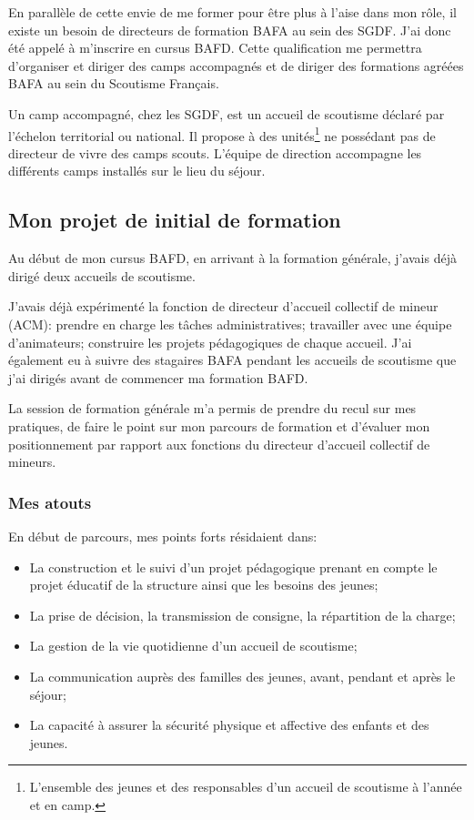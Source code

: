 \documentclass[titlepage,11pt,a4paper]{article}
\begin{document}
En parallèle de cette envie de me former pour être plus à l'aise dans mon rôle,
il existe un besoin de directeurs de formation BAFA au sein des SGDF. J'ai donc été appelé
à m'inscrire en cursus BAFD. Cette qualification me permettra d'organiser et diriger des
camps accompagnés et de diriger des formations agréées BAFA au sein du Scoutisme Français.

Un camp accompagné, chez les SGDF, est un accueil de scoutisme déclaré par l'échelon
territorial ou national. Il propose à des unités\footnote{L'ensemble des jeunes et des
responsables d'un accueil de scoutisme à l'année et en camp.} ne possédant pas
de directeur de vivre des camps scouts. L'équipe de direction accompagne les différents
camps installés sur le lieu du séjour.

\subsection{Mon projet de initial de formation}

Au début de mon cursus BAFD, en arrivant à la formation générale, j'avais déjà dirigé deux
accueils de scoutisme.

J'avais déjà expérimenté la fonction de directeur d'accueil collectif de mineur (ACM):
prendre en charge les tâches administratives; travailler avec une équipe d'animateurs;
construire les projets pédagogiques de chaque accueil. J'ai également eu à suivre des
stagaires BAFA pendant les accueils de scoutisme que j'ai dirigés avant de commencer ma
formation BAFD.

La session de formation générale m'a permis de prendre du recul sur mes pratiques, de
faire le point sur mon parcours de formation et d'évaluer mon positionnement par rapport
aux fonctions du directeur d'accueil collectif de mineurs.

\subsubsection{Mes atouts}

En début de parcours, mes points forts résidaient dans:

\begin{itemize}
   \item La construction et le suivi d'un projet pédagogique prenant en compte le
      projet éducatif de la structure ainsi que les besoins des jeunes;
   \item La prise de décision, la transmission de consigne, la répartition de la charge;
   \item La gestion de la vie quotidienne d'un accueil de scoutisme;
   \item La communication auprès des familles des jeunes, avant, pendant et après le
      séjour;
   \item La capacité à assurer la sécurité physique et affective des enfants et des
      jeunes.
\end{itemize}
\end{document}
